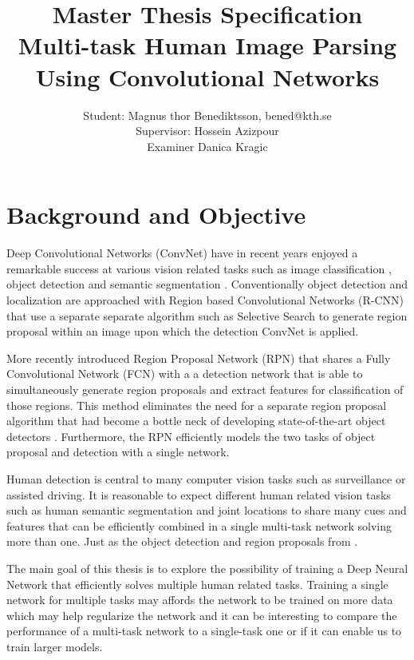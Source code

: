 \documentclass[a4paper,10pt]{article}
\title{Master Thesis Specification \\ Multi-task Human Image Parsing Using Convolutional Networks}
\author{Student: Magnus thor Benediktsson, bened@kth.se \\ Supervisor: Hossein Azizpour \\ Examiner Danica Kragic}
\begin{document}
\maketitle



\section{Background and Objective}

Deep Convolutional Networks (ConvNet) have in recent years enjoyed a remarkable success at various vision related tasks such as image classification \cite{He2015,Szegedy2014,Krizhevsky2012}, object detection \cite{Ren2015} and semantic segmentation \cite{Long2014,Noh2015}. Conventionally object detection and localization are approached with Region based Convolutional Networks (R-CNN) \cite{Girshick2014} that use a separate separate algorithm such as Selective Search \cite{Uijlings2013} to generate region proposal within an image upon which the detection ConvNet is applied.  


More recently \cite{Ren2015} introduced Region Proposal Network (RPN) that shares a Fully Convolutional Network (FCN) \cite{Long2014} with a a detection network that is able to simultaneously generate region proposals and extract features for classification of those regions.  This method eliminates the need for a separate region proposal algorithm that had become a bottle neck of developing state-of-the-art object detectors \cite{Ren2015}.  Furthermore, the RPN efficiently models the two tasks of object proposal and detection with a single network.

Human detection is central to many computer vision tasks such as surveillance or assisted driving. It is reasonable to expect different human related vision tasks such as human semantic segmentation \cite{Long2014,Noh2015} and joint locations \cite{Tompson2015,Wei2016} to share many cues and features that can be efficiently combined in a single multi-task network solving more than one.  Just as the object detection and region proposals from \cite{Ren2015}.

The main goal of this thesis is to explore the possibility of training a Deep Neural Network that efficiently solves multiple human related tasks.  Training a single network for multiple tasks may affords the network to be trained on more data which may help regularize the network and it can be interesting to compare the performance of a multi-task network to a single-task one or if it can enable us to train larger models.
\end{document}
